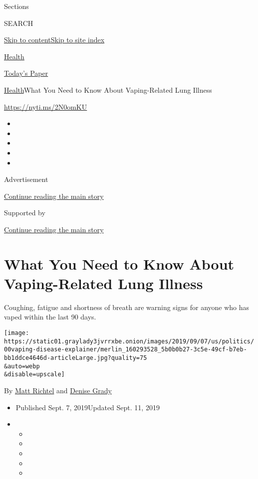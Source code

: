 Sections

SEARCH

\protect\hyperlink{site-content}{Skip to
content}\protect\hyperlink{site-index}{Skip to site index}

\href{https://www.nytimes3xbfgragh.onion/section/health}{Health}

\href{https://myaccount.nytimes3xbfgragh.onion/auth/login?response_type=cookie\&client_id=vi}{}

\href{https://www.nytimes3xbfgragh.onion/section/todayspaper}{Today's
Paper}

\href{/section/health}{Health}\textbar{}What You Need to Know About
Vaping-Related Lung Illness

\url{https://nyti.ms/2N0omKU}

\begin{itemize}
\item
\item
\item
\item
\item
\end{itemize}

Advertisement

\protect\hyperlink{after-top}{Continue reading the main story}

Supported by

\protect\hyperlink{after-sponsor}{Continue reading the main story}

\hypertarget{what-you-need-to-know-about-vaping-related-lung-illness}{%
\section{What You Need to Know About Vaping-Related Lung
Illness}\label{what-you-need-to-know-about-vaping-related-lung-illness}}

Coughing, fatigue and shortness of breath are warning signs for anyone
who has vaped within the last 90 days.

\texttt{[image: https://static01.graylady3jvrrxbe.onion/images/2019/09/07/us/politics/00vaping-disease-explainer/merlin\_160293528\_5b0b0b27-3c5e-49cf-b7eb-bb1ddce4646d-articleLarge.jpg?quality=75\\\&auto=webp\\\&disable=upscale]}

By \href{https://www.nytimes3xbfgragh.onion/by/matt-richtel}{Matt
Richtel} and
\href{https://www.nytimes3xbfgragh.onion/by/denise-grady}{Denise Grady}

\begin{itemize}
\item
  Published Sept. 7, 2019Updated Sept. 11, 2019
\item
  \begin{itemize}
  \item
  \item
  \item
  \item
  \item
  \end{itemize}
\end{itemize}

